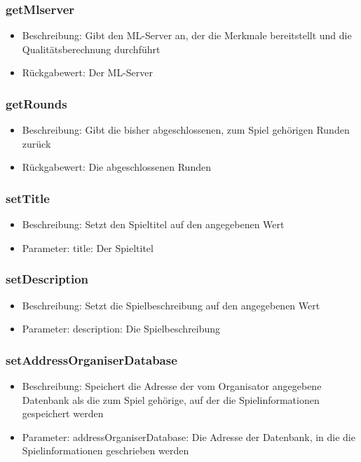 \documentclass[a4paper]{scrreprt}
\begin{document}
    \subsubsection{getMlserver}
    \begin{itemize}
        \item Beschreibung: Gibt den ML-Server an, der die Merkmale bereitstellt und die Qualitätsberechnung durchführt
        \item Rückgabewert: Der ML-Server
    \end{itemize}
    \subsubsection{getRounds}
    \begin{itemize}
        \item Beschreibung: Gibt die bisher abgeschlossenen, zum Spiel gehörigen Runden zurück
        \item Rückgabewert: Die abgeschlossenen Runden
    \end{itemize}
    \subsubsection{setTitle}
    \begin{itemize}
        \item Beschreibung: Setzt den Spieltitel auf den angegebenen Wert
        \item Parameter: title: Der Spieltitel
    \end{itemize}
    \subsubsection{setDescription}
    \begin{itemize}
        \item Beschreibung: Setzt die Spielbeschreibung auf den angegebenen Wert
        \item Parameter: description: Die Spielbeschreibung
    \end{itemize}
    \subsubsection{setAddressOrganiserDatabase}
    \begin{itemize}
        \item Beschreibung: Speichert die Adresse der vom Organisator angegebene Datenbank als die zum Spiel gehörige, auf der die Spielinformationen gespeichert werden
        \item Parameter: addressOrganiserDatabase: Die Adresse der Datenbank, in die die Spielinformationen geschrieben werden
    \end{itemize}
\end{document}
